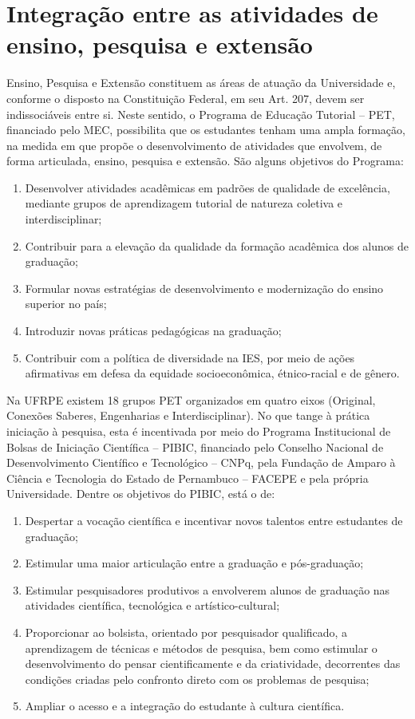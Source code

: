 \documentclass[
	12pt,				%
	openright,			%
  oneside,     %
	a4paper,			%
	chapter=TITLE,		%
	english,			%
	french,				%
	spanish,			%
	brazil				%
	]{abntex2}
\begin{document}
\section{Integração entre as atividades de ensino, pesquisa e extensão}

Ensino, Pesquisa e Extensão constituem as áreas de atuação da Universidade e, conforme o disposto na Constituição Federal, em seu Art. 207, devem ser indissociáveis entre si. Neste sentido, o Programa de Educação Tutorial – PET, financiado pelo MEC, possibilita que os estudantes tenham uma ampla formação, na medida em que propõe o desenvolvimento de atividades que envolvem, de forma articulada, ensino, pesquisa e extensão. São alguns objetivos do Programa:

\begin{enumerate}[label=(\alph*)]
    \item Desenvolver atividades acadêmicas em padrões de qualidade de excelência, mediante grupos 	de aprendizagem tutorial de natureza coletiva e interdisciplinar;
    \item Contribuir para a elevação da qualidade da formação acadêmica dos alunos de graduação;
    \item Formular novas estratégias de	desenvolvimento e modernização do ensino superior no país;
    \item Introduzir novas práticas pedagógicas na graduação; 
    \item Contribuir com a política de diversidade na IES, por meio de ações afirmativas em defesa da equidade socioeconômica, étnico-racial e de gênero.
\end{enumerate}

	Na UFRPE existem 18 grupos PET organizados em quatro eixos (Original, Conexões Saberes, Engenharias e Interdisciplinar). No que tange à prática iniciação à pesquisa, esta é incentivada por meio do Programa Institucional de Bolsas de Iniciação Científica – PIBIC, financiado pelo Conselho Nacional de Desenvolvimento Científico e Tecnológico – CNPq, pela Fundação de Amparo à Ciência e Tecnologia do Estado de Pernambuco – FACEPE e pela própria Universidade. Dentre os objetivos do PIBIC, está o de:

\begin{enumerate}[label=(\alph*)]
    \item Despertar a vocação científica e incentivar novos talentos entre estudantes de graduação;
    \item Estimular uma maior articulação entre a graduação e pós-graduação;
    \item Estimular pesquisadores produtivos a envolverem alunos de graduação nas atividades científica, tecnológica e artístico-cultural;
    \item Proporcionar ao bolsista, orientado por pesquisador qualificado, a aprendizagem de técnicas e métodos de pesquisa, bem como estimular o desenvolvimento do pensar cientificamente e da criatividade, decorrentes das condições criadas pelo confronto direto com os  problemas de pesquisa;
    \item Ampliar o acesso e a integração do estudante à cultura científica.
\end{enumerate}
\end{document}
